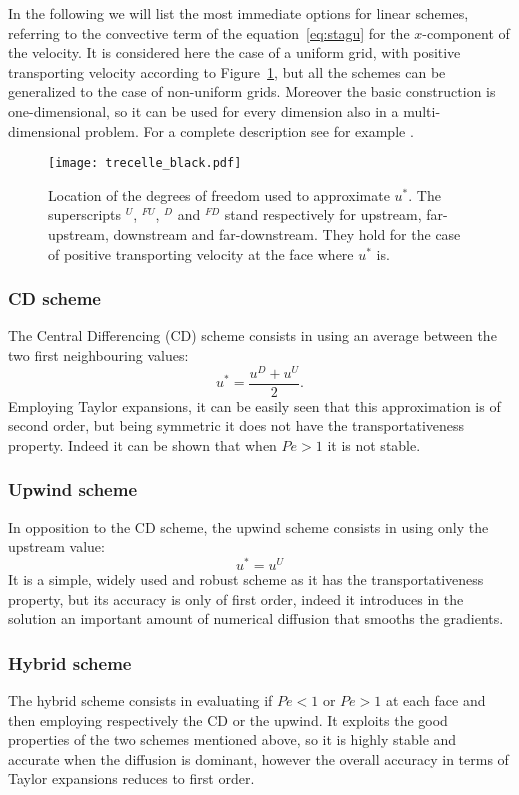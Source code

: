 In the following we will list the most immediate options for linear schemes, 
referring to the 
convective term of the equation~\eqref{eq:stagu} for the $x$-component of the 
velocity. It is considered here the case of a uniform grid, with positive 
transporting velocity according to 
Figure~\ref{fig:superscripts}, but all the schemes can be generalized to the 
case of non-uniform grids. Moreover the basic construction is one-dimensional, 
so it can be used for every dimension also in a multi-dimensional problem. For 
a complete description see for example \cite{main:vermal}.
\begin{figure}
	\centering
	\texttt{[image: trecelle\_black.pdf]}
	\caption[Location of the degrees of freedom used to approximate 
	$u^*$]{Location of the degrees of freedom used to approximate $u^*$. The 
	superscripts $^U$, $^{FU}$, $^D$ and $^{FD}$ stand respectively for 
	upstream, far-upstream, downstream and far-downstream. They hold for the 
	case of positive transporting velocity at the face where $u^*$ is.}
	\label{fig:superscripts}
\end{figure}
\subsubsection{CD scheme}
The Central Differencing (CD) scheme consists in using an average between the 
two first neighbouring values:
\begin{equation} \label{eq:cd}
	u^* = \frac{u^D + u^U}{2}.
\end{equation}
Employing Taylor expansions, it can be easily seen that this approximation is 
of second order, but being symmetric it does not have the transportativeness 
property. Indeed it can be shown that when $Pe > 1$ it is not stable.
%
\subsubsection{Upwind scheme}
In opposition to the CD scheme, the upwind scheme consists in using only the 
upstream value:
\begin{equation} \label{eq:upwind}
	u^* = u^U
\end{equation}
It is a simple, widely used and robust scheme as it has the transportativeness 
property, but its accuracy is only of first order, indeed it introduces in the 
solution an important amount of numerical diffusion that smooths the gradients. 
%
\subsubsection{Hybrid scheme}
The hybrid scheme \cite{diff:hybrid} consists in evaluating if $Pe<1$ or 
$Pe>1$ at each face and then employing respectively the CD or the upwind. It 
exploits the good properties of the two schemes mentioned above, so it is 
highly stable and accurate when the diffusion is dominant, however the overall 
accuracy in terms of Taylor expansions reduces to first order.
%
